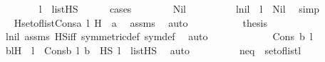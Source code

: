\begin{isabellebody}
\ \ \ \ \ \ \isamarkupfalse%
\ {\isacartoucheopen}l\ {\isasymin}\ list{\isacharparenleft}{\kern0pt}HS{\isacharparenright}{\kern0pt}{\isacartoucheclose}\ \isanewline
\ \ \ \ \isamarkupfalse%
{\isacharparenleft}{\kern0pt}cases{\isacharparenright}{\kern0pt}\isanewline
\ \ \ \ \ \ \isamarkupfalse%
\ Nil\isanewline
\ \ \ \ \ \ \isamarkupfalse%
\ \isamarkupfalse%
\ lnil\ {\isacharcolon}{\kern0pt}\ {\isachardoublequoteopen}l\ {\isacharequal}{\kern0pt}\ Nil{\isachardoublequoteclose}\ \isamarkupfalse%
\ simp\isanewline
\ \ \ \ \ \ \isamarkupfalse%
\ \isamarkupfalse%
\ {\isachardoublequoteopen}{\isacharparenleft}{\kern0pt}{\isasymInter}H{\isasymin}set{\isacharunderscore}{\kern0pt}of{\isacharunderscore}{\kern0pt}list{\isacharparenleft}{\kern0pt}Cons{\isacharparenleft}{\kern0pt}a{\isacharcomma}{\kern0pt}\ l{\isacharparenright}{\kern0pt}{\isacharparenright}{\kern0pt}{\isachardot}{\kern0pt}\ H{\isacharparenright}{\kern0pt}\ {\isacharequal}{\kern0pt}\ a{\isachardoublequoteclose}\ \isamarkupfalse%
\ assms\ \isamarkupfalse%
\ auto\ \isanewline
\ \ \ \ \ \ \isamarkupfalse%
\ \isamarkupfalse%
\ {\isacharquery}{\kern0pt}thesis\ \isamarkupfalse%
\ lnil\ assms\ HS{\isacharunderscore}{\kern0pt}iff\ symmetric{\isacharunderscore}{\kern0pt}def\ sym{\isacharunderscore}{\kern0pt}def\ \isamarkupfalse%
\ auto\isanewline
\ \ \ \ \isamarkupfalse%
\isanewline
\ \ \ \ \ \ \isamarkupfalse%
\ {\isacharparenleft}{\kern0pt}Cons\ b\ l{\isacharprime}{\kern0pt}{\isacharparenright}{\kern0pt}\isanewline
\isanewline
\ \ \ \ \ \ \isamarkupfalse%
\ \isamarkupfalse%
\ bl{\isacharprime}{\kern0pt}H\ {\isacharcolon}{\kern0pt}\ {\isachardoublequoteopen}l\ {\isacharequal}{\kern0pt}\ Cons{\isacharparenleft}{\kern0pt}b{\isacharcomma}{\kern0pt}\ l{\isacharprime}{\kern0pt}{\isacharparenright}{\kern0pt}{\isachardoublequoteclose}\ {\isachardoublequoteopen}b\ {\isasymin}\ HS{\isachardoublequoteclose}\ {\isachardoublequoteopen}l{\isacharprime}{\kern0pt}\ {\isasymin}\ list{\isacharparenleft}{\kern0pt}HS{\isacharparenright}{\kern0pt}{\isachardoublequoteclose}\ \isamarkupfalse%
\ auto\isanewline
\ \ \ \ \ \ \isamarkupfalse%
\ \isamarkupfalse%
\ neq{}\ {\isacharcolon}{\kern0pt}\ {\isachardoublequoteopen}set{\isacharunderscore}{\kern0pt}of{\isacharunderscore}{\kern0pt}list{\isacharparenleft}{\kern0pt}l{\isacharparenright}{\kern0pt}\ {\isasymnoteq}\ {}{\isachardoublequoteclose}\ \isamarkupfalse%

\end{isabellebody}
